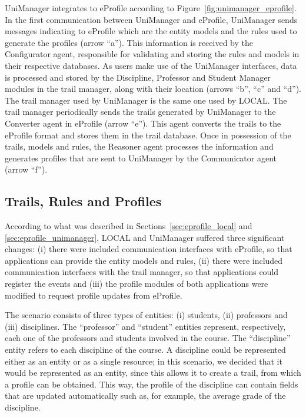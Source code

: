 \documentclass{svjour3}                     %
\begin{document}
UniManager integrates to eProfile according to Figure~\ref{fig:unimanager_eprofile}. In the first communication between UniManager and eProfile,  UniManager sends messages indicating to eProfile which are the entity models and the rules used to generate the profiles (arrow ``a'').  This information is received by the Configurator agent, responsible for validating and storing the rules and models in their respective databases. As users make use of the UniManager interfaces, data is processed and stored by the Discipline, Professor and Student Manager modules in the trail manager, along with their location (arrows ``b'', ``c'' and ``d''). The trail manager used by UniManager is the same one used by LOCAL. The trail manager periodically sends the trails generated by UniManager to the Converter agent in eProfile (arrow ``e''). This agent converts the trails to the eProfile format and stores them in the trail database. Once in possession of the trails, models and rules, the Reasoner agent processes the information and generates profiles that are sent to UniManager by the Communicator agent (arrow ``f''). 



\subsection{Trails, Rules and Profiles}
\label{sec:trilhas_cen1}

According to what was described in Sections~\ref{sec:eprofile_local} and \ref{sec:eprofile_unimanager}, LOCAL and UniManager suffered three significant changes: (i) there were included communication interfaces with eProfile, so that applications can provide the entity models and rules, (ii) there were included  communication interfaces with the trail manager, so that applications could register the events and (iii) the profile modules of both applications were modified to request profile updates from eProfile.

The scenario consists of three types of entities: (i) students, (ii) professors and (iii) disciplines. The ``professor'' and ``student'' entities represent, respectively, each one of the professors and students involved in the course. The ``discipline'' entity refers to each discipline of the course. A discipline could be represented either as an entity or as a single resource; in this scenario, we decided that it would be represented as an entity, since this  allows it to create a trail, from which a profile can be obtained. This way, the profile of the discipline can contain fields that are updated automatically such as, for example, the average grade of the discipline.
\end{document}
